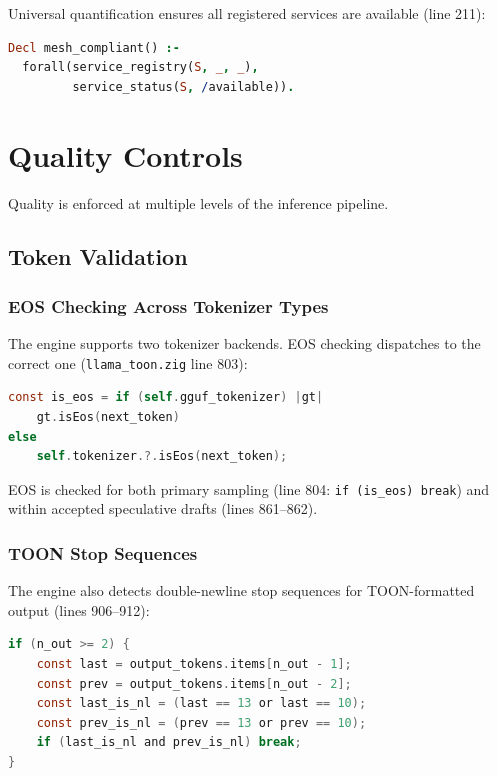 \documentclass[11pt]{article}
\begin{document}
Universal quantification ensures all registered services are available
(line 211):

\begin{lstlisting}[language=Prolog,caption={Mesh compliance (rules.mg:211)}]
Decl mesh_compliant() :-
  forall(service_registry(S, _, _),
         service_status(S, /available)).
\end{lstlisting}

\section{Quality Controls}
\label{sec:quality}

Quality is enforced at multiple levels of the inference pipeline.

\subsection{Token Validation}

\subsubsection{EOS Checking Across Tokenizer Types}

The engine supports two tokenizer backends. EOS checking dispatches to the
correct one (\texttt{llama\_toon.zig} line 803):

\begin{lstlisting}[language=C,caption={Dual tokenizer EOS check (llama\_toon.zig:803)}]
const is_eos = if (self.gguf_tokenizer) |gt|
    gt.isEos(next_token)
else
    self.tokenizer.?.isEos(next_token);
\end{lstlisting}

EOS is checked for both primary sampling (line 804: \texttt{if (is\_eos) break})
and within accepted speculative drafts (lines 861--862).

\subsubsection{TOON Stop Sequences}

The engine also detects double-newline stop sequences for TOON-formatted output
(lines 906--912):

\begin{lstlisting}[language=C,caption={TOON stop detection (llama\_toon.zig:906--912)}]
if (n_out >= 2) {
    const last = output_tokens.items[n_out - 1];
    const prev = output_tokens.items[n_out - 2];
    const last_is_nl = (last == 13 or last == 10);
    const prev_is_nl = (prev == 13 or prev == 10);
    if (last_is_nl and prev_is_nl) break;
}
\end{lstlisting}
\end{document}
